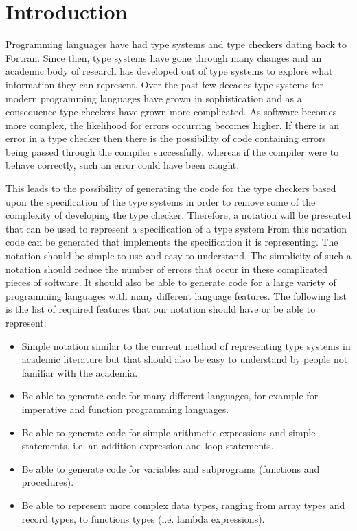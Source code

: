 \chapter{Introduction}
\label{chap:intro}
Programming languages have had type systems and type checkers dating back to Fortran\cite{Backus:1978:HFI:960118.808380}.
Since then, type systems have gone through many changes and an academic body of research has developed out of type systems to explore what information they can represent\cite{cardelli1996type}.
Over the past few decades type systems for modern programming languages have grown in sophistication and as a consequence type checkers have grown more complicated.
As software becomes more complex, the likelihood for errors occurring becomes higher.
If there is an error in a type checker then there is the possibility of code containing errors being passed through the compiler successfully, whereas if the compiler were to behave correctly, such an error could have been caught.

This leads to the possibility of generating the code for the type checkers based upon the specification of the type systems in order to remove some of the complexity of developing the type checker.
Therefore, a notation will be presented that can be used to represent a specification of a type system
From this notation code can be generated that implements the specification it is representing.
The notation should be simple to use and easy to understand, The simplicity of such a notation should reduce the number of errors that occur in these complicated pieces of software.
It should also be able to generate code for a large variety of programming languages with many different language features.
The following list is the list of required features that our notation should have or be able to represent:
\begin{itemize}
    \label{itms:aims}
    \item Simple notation similar to the current method of representing type systems in academic literature but that should also be easy to understand by people not familiar with the academia.
    \item Be able to generate code for many different languages, for example for imperative and function programming languages.
    \item Be able to generate code for simple arithmetic expressions and simple statements, i.e. an addition expression and loop statements.
    \item Be able to generate code for variables and subprograms (functions and procedures).
    \item Be able to represent more complex data types, ranging from array types and record types, to functions types (i.e. lambda expressions).
\end{itemize}

